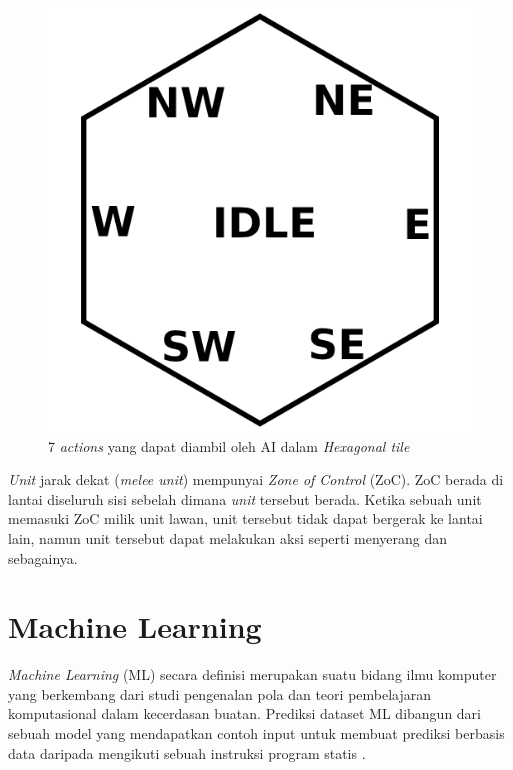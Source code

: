 \begin{figure}[H]
  \centering
    \includegraphics[scale=0.6]{gambar/hex_action.png}
    \caption{7 \emph{actions} yang dapat diambil oleh AI dalam \emph{Hexagonal tile}}
    \label{fig:hex_action}
\end{figure}

\emph{Unit} jarak dekat (\emph{melee unit})  mempunyai \emph{Zone of Control} (ZoC). ZoC berada di lantai diseluruh sisi sebelah dimana 
\emph{unit} tersebut berada. Ketika sebuah unit memasuki ZoC milik unit lawan, unit tersebut tidak dapat bergerak ke lantai lain, namun
unit tersebut dapat melakukan aksi seperti menyerang dan sebagainya.

\section{Machine Learning}
\emph{Machine Learning} (ML) secara definisi merupakan suatu bidang ilmu komputer yang berkembang dari studi pengenalan pola dan teori pembelajaran komputasional dalam kecerdasan buatan. 
Prediksi dataset ML dibangun dari sebuah model yang mendapatkan contoh input untuk membuat prediksi berbasis data daripada mengikuti sebuah instruksi program statis \citep{machineL}.

